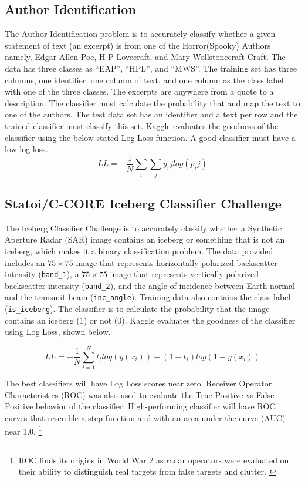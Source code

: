 \documentclass[fleqn,10pt]{SelfArx} %
\begin{document}
\subsection{Author Identification}
The Author Identification problem is to accurately classify whether a given statement of text (an excerpt) is from one of the Horror(Spooky) Authors namely, Edgar Allen Poe, H P Lovecraft, and Mary Wollstonecraft Craft. The data has three classes as “EAP”, “HPL”, and “MWS”. The training set has three columns, one identifier, one column of text, and one column as the class label with one of the three classes. The excerpts are anywhere from a quote to a description. The classifier must calculate the probability that and map the text to one of the authors. The test data set has an identifier and a text per row and the trained classifier must classify this set. Kaggle evaluates the goodness of the classifier using the below stated Log Loss function. A good classifier must have a low log loss.
$$LL = - \frac{1}{N} \sum_{i} \sum_{j} y_ij log(p_ij)$$


\subsection{Statoi/C-CORE Iceberg Classifier Challenge}

The Iceberg Classifier Challenge is to accurately classify whether a Synthetic Aperture Radar (SAR) image contains an iceberg or something that is not an iceberg, which makes it a binary classification problem.  The data provided includes an $75 \times 75$ image that represents horizontally polarized backscatter intensity (\texttt{band\_1}), a $75 \times 75$ image that represents vertically polarized backscatter intensity (\texttt{band\_2}), and the angle of incidence between Earth-normal and the transmit beam (\texttt{inc\_angle}).  Training data also contains the class label (\texttt{is\_iceberg}).  The classifier is to calculate the probability that the image contains an iceberg (1) or not (0).  Kaggle evaluates the goodness of the classifier using Log Loss, shown below.

$$LL = - \frac{1}{N} \sum_{i=1}^N t_i log(y(x_i)) + (1-t_i) log(1-y(x_i))$$

The best classifiers will have Log Loss scores near zero. Receiver Operator Characteristics (ROC) was also used to evaluate the True Positive vs False Positive behavior of the classifier.  High-performing classifier will have ROC curves that resemble a step function and with an area under the curve (AUC) near 1.0.  \footnote{ROC finds its origins in World War 2 as radar operators were evaluated on their ability to distinguish real targets from false targets and clutter. \cite{Lusted1217}}
\end{document}
